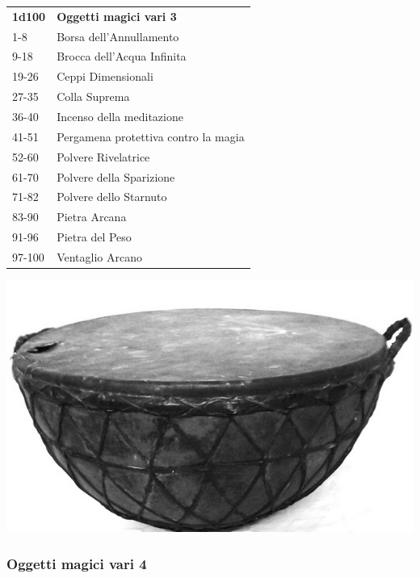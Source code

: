 \begin{multicols}{2}
\begin{tabularx}{0.45\textwidth}{lX}
\textbf{1d100} & \textbf{Oggetti magici vari 3}\\
1-8 &Borsa dell'Annullamento\\
9-18 &Brocca dell'Acqua Infinita\\
19-26& Ceppi Dimensionali\\
27-35& Colla Suprema\\
36-40& Incenso della meditazione\\
41-51& Pergamena protettiva contro la magia\\
52-60& Polvere Rivelatrice\\
61-70& Polvere della Sparizione\\
71-82& Polvere dello Starnuto\\
83-90& Pietra Arcana\\
91-96& Pietra del Peso\\
97-100& Ventaglio Arcano\\
\end{tabularx}

\begin{center}
\includegraphics[width=0.8\linewidth]{immagini/ancientdrum.png}
\end{center}


\subsubsection{Oggetti magici vari 4}


\end{multicols}
